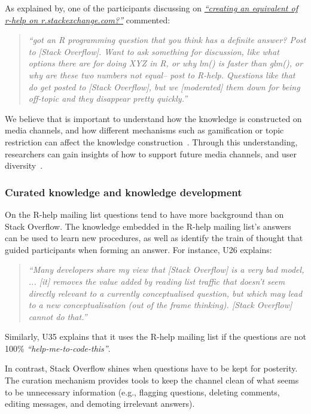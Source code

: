 \documentclass{sig-alternate-05-2015}
\begin{document}

	As explained by, one of the participants discussing on \textit{\href{http://goo.gl/mTccwx}{``creating an equivalent of r-help on r.stackexchange.com?''}} commented:
	\begin{quote}
	    \textit{``got an R programming question that you think has a definite answer? Post to [Stack Overflow]. Want to ask something for discussion, like what options there are for doing XYZ in R, or why lm() is faster than glm(), or why are these two numbers not equal-- post to R-help. Questions like that do get posted to [Stack Overflow], but we [moderated] them down for being off-topic and they disappear pretty quickly.''}
    \end{quote}

	We believe that is important to understand how the knowledge is constructed on media channels, and how different mechanisms such as gamification or topic restriction can affect the knowledge construction~\cite{Li2015}.
	Through this understanding, researchers can gain insights of how to support future media channels, and user diversity~\cite{Vasilescu2014b}.


	\subsubsection{Curated knowledge and knowledge development}

	On the R-help mailing list questions tend to have more background than on Stack Overflow.
	The knowledge embedded in the R-help mailing list's answers can be used to learn new procedures, as well as identify the train of thought that guided participants when forming an answer.
	For instance, U26 explains:
    \begin{quote}
	    \textit{``Many developers share my view that [Stack Overflow] is a very bad model, ... [it] removes the value added by reading list traffic that doesn't seem directly relevant to a currently conceptualised question, but which may lead to a new conceptualisation (out of the frame thinking). [Stack Overflow] cannot do that.''}
    \end{quote}
	Similarly, U35 explains that it uses the R-help mailing list if the questions are not 100\% \textit{``help-me-to-code-this''}.

	In contrast, Stack Overflow shines when questions have to be kept for posterity. 
	The curation mechanism provides tools to keep the channel clean of what seems to be unnecessary information (e.g., flagging questions, deleting comments, editing messages, and demoting irrelevant answers).
\end{document}

